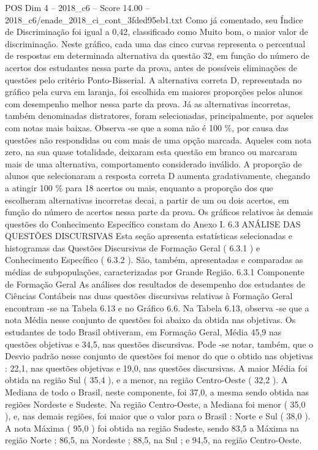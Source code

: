 \begin{textsample}{POS Dim 4 – 2018\_c6 – Score 14.00 – 2018\_c6/enade\_2018\_ci\_cont\_3fded95eb1.txt}
Como já comentado, seu Índice de Discriminação foi igual a 0,42, classificado como Muito bom, o maior valor de discriminação.
Neste gráfico, cada uma das cinco curvas representa o percentual de respostas em determinada alternativa da questão 32, em função do número de acertos dos estudantes nessa parte da prova, antes de possíveis eliminações de questões pelo critério Ponto-Bisserial.
A alternativa correta D, representada no gráfico pela curva em laranja, foi escolhida em maiores proporções pelos alunos com desempenho melhor nessa parte da prova.
Já as alternativas incorretas, também denominadas distratores, foram selecionadas, principalmente, por aqueles com notas mais baixas.
Observa -se que a soma não é 100 \%, por causa das questões não respondidas ou com mais de uma opção marcada.
Aqueles com nota zero, na sua quase totalidade, deixaram esta questão em branco ou marcaram mais de uma alternativa, comportamento considerado inválido.
A proporção de alunos que selecionaram a resposta correta D aumenta gradativamente, chegando a atingir 100 \% para 18 acertos ou mais, enquanto a proporção dos que escolheram alternativas incorretas decai, a partir de um ou dois acertos, em função do número de acertos nessa parte da prova.
Os gráficos relativos às demais questões do Conhecimento Específico constam do Anexo I. 6.3 ANÁLISE DAS QUESTÕES DISCURSIVAS Esta seção apresenta estatísticas selecionadas e histogramas das Questões Discursivas de Formação Geral ( 6.3.1 ) e Conhecimento Específico ( 6.3.2 ).
São, também, apresentadas e comparadas as médias de subpopulações, caracterizadas por Grande Região. 6.3.1 Componente de Formação Geral As análises dos resultados de desempenho dos estudantes de Ciências Contábeis nas duas questões discursivas relativas à Formação Geral encontram -se na Tabela 6.13 e no Gráfico 6.6.
Na Tabela 6.13, observa -se que a nota Média nesse conjunto de questões foi abaixo da obtida nas objetivas.
Os estudantes de todo Brasil obtiveram, em Formação Geral, Média 45,9 nas questões objetivas e 34,5, nas questões discursivas.
Pode -se notar, também, que o Desvio padrão nesse conjunto de questões foi menor do que o obtido nas objetivas : 22,1, nas questões objetivas e 19,0, nas questões discursivas.
A maior Média foi obtida na região Sul ( 35,4 ), e a menor, na região Centro-Oeste ( 32,2 ).
A Mediana de todo o Brasil, neste componente, foi 37,0, a mesma sendo obtida nas regiões Nordeste e Sudeste.
Na região Centro-Oeste, a Mediana foi menor ( 35,0 ), e, nas demais regiões, foi maior que o valor para o Brasil : Norte e Sul ( 38,0 ).
A nota Máxima ( 95,0 ) foi obtida na região Sudeste, sendo 83,5 a Máxima na região Norte ; 86,5, na Nordeste ; 88,5, na Sul ; e 94,5, na região Centro-Oeste.

\end{textsample}
